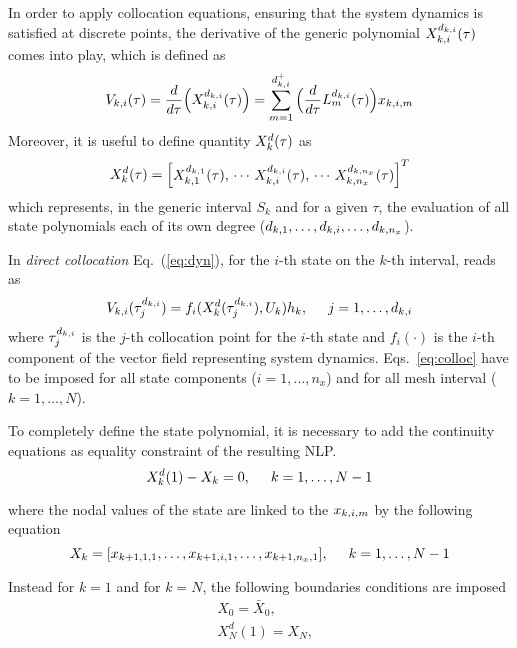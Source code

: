In order to apply collocation equations, ensuring that the system dynamics is satisfied at discrete points, the derivative of the generic polynomial $X_{k,i}^{d_{k,i}} (\tau)$ comes into play, which is defined as
\begin{equation}
V_{k,i} (\tau) = \frac{d}{d\tau}\Big(X_{k,i}^{d_{k,i}}(\tau)\Big) = \sum_{m=1}^{d_{k,i}^{+}}\Big(\frac{d}{d\tau}L_{m}^{d_{k,i}}(\tau)\Big)x_{k,i,m}
\end{equation}
Moreover, it is useful to define quantity $X_{k}^{d} (\tau)$ as
\begin{equation}
X_{k}^{d}(\tau) =
\begin{bmatrix}
X_{k,1}^{d_{k,1}}(\tau),\, \cdots \, X_{k,i}^{d_{k,i}}(\tau), \, \cdots\, 
X_{k,n_x}^{d_{k,n_x}}(\tau)
\end{bmatrix}^T
\end{equation}
which represents, in the generic interval $S_k$ and for a given $\tau$, the evaluation of all state polynomials each of its own degree ($d_{k,1}, \dots, d_{k,i}, \dots, d_{k,n_{x}}$).

In \emph{direct collocation} Eq.~(\ref{eq:dyn}), for the $i$-th state on the $k$-th interval, reads as
\begin{equation}\label{eq:colloc}
V_{k,i}(\tau_{j}^{d_{k,i}}) = f_i(X_{k}^{d}(\tau_{j}^{d_{k,i}}),  U_k) h_{k}, \hspace{5mm} j = 1, \dots, d_{k,i}
\end{equation}
where $\tau_{j}^{d_{k,i}}$ is the $j$-th collocation point for the $i$-th state and $f_i(\cdot)$ is the $i$-th component of the vector field representing system dynamics. Eqs.~\eqref{eq:colloc} have to be imposed for all state components ($i = 1, \dots, n_x$) and for all mesh interval ($k = 1, \dots, N$).

To completely define the state polynomial, it is necessary to add the continuity equations  as equality constraint of the resulting NLP.    
\begin{equation}\label{eq:continuity}
X_{k}^{d}(1) - X_k = 0, \hspace{5mm} k = 1, \dots, N-1
\end{equation}

where the nodal values of the state are linked to the $x_{k,i,m}$ by the following equation
\begin{equation}
X_k = [x_{k+1,1,1}, \dots, x_{k+1,i,1}, \dots, x_{k+1,n_{x},1}], \hspace{5mm} k = 1, \dots, N-1
\end{equation}

Instead for $k = 1$ and for $k = N$, the following boundaries conditions are imposed
\begin{subequations}
	\begin{align}
	& X_{0} = \bar{X}_{0} \label{eq:intial},\\
	& X_{N}^{d}(1) = X_N \label{eq:final},
	\end{align}
\end{subequations} 

